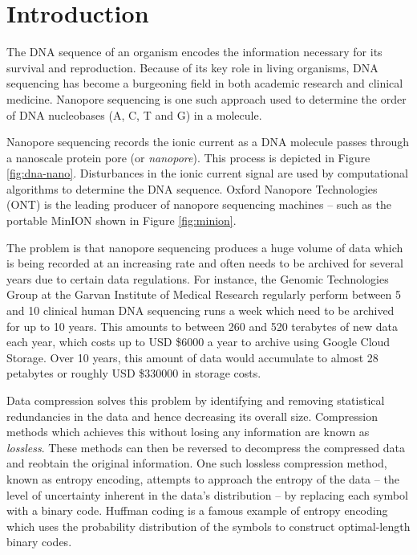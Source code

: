 \chapter{Introduction}


The DNA sequence of an organism encodes the information necessary for its
survival and reproduction.
Because of its key role in living organisms, DNA sequencing has become a
burgeoning field in both academic research and clinical medicine.
Nanopore sequencing is one such approach used to determine the order of
DNA nucleobases (A, C, T and G) in a molecule.

Nanopore sequencing records the ionic current as a DNA molecule passes through a
nanoscale protein pore (or \textit{nanopore}).
This process is depicted in Figure \ref{fig:dna-nano}.
Disturbances in the ionic current
signal are used by computational algorithms to determine the DNA sequence.
Oxford Nanopore Technologies (ONT) is the leading producer of nanopore
sequencing machines -- such as the portable MinION shown in Figure \ref{fig:minion}.




The problem is that nanopore sequencing produces a huge volume of data which is
being recorded at an increasing rate and often needs to be archived for several
years due to certain data regulations.
For instance, the Genomic Technologies Group at the Garvan Institute of Medical
Research regularly perform between 5 and 10 clinical human DNA sequencing runs a
week which need to be archived for up to 10 years.
This amounts to between 260 and 520 terabytes of new data each year, which costs
up to USD \$6000 a year to archive using Google Cloud Storage. Over 10 years,
this amount of data would accumulate to almost 28 petabytes or roughly USD
\$\num{330000} in storage costs.

Data compression solves this problem by identifying and removing statistical
redundancies in the data and hence decreasing its overall size.
Compression methods which achieves this without losing any information are
known as \textit{lossless}. These methods can then be reversed to decompress the
compressed data and reobtain the original information. One such lossless
compression method, known as entropy encoding, attempts to approach the entropy
of the data -- the level of uncertainty inherent in the data's distribution --
by replacing each symbol with a binary code. Huffman coding is a famous example
of entropy encoding which uses the probability distribution of the symbols to
construct optimal-length binary codes.

